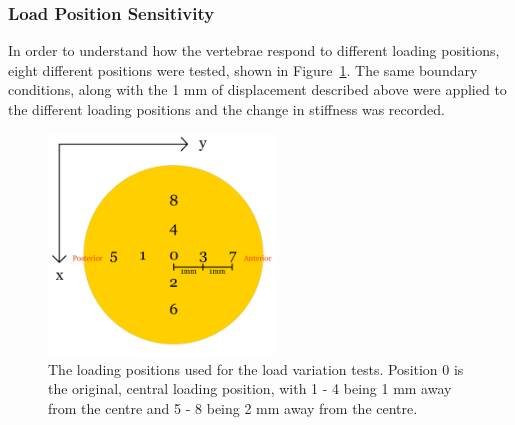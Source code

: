




\subsubsection{Load Position Sensitivity}

In order to understand how the vertebrae respond to different loading positions, eight different positions were tested, shown in Figure~\ref{fig:loading_pos}. The same boundary conditions, along with the 1 mm of displacement described above were applied to the different loading positions and the change in stiffness was recorded.

\begin{figure}[ht!]
\centering
\includegraphics[width=6cm]{Chapters/Chapter_HT_images/Loading_positions.png}
\caption{The loading positions used for the load variation tests. Position 0 is the original, central loading position, with 1 - 4 being 1 mm away from the centre and 5 - 8 being 2 mm away from the centre.}
\label{fig:loading_pos}
\end{figure}


